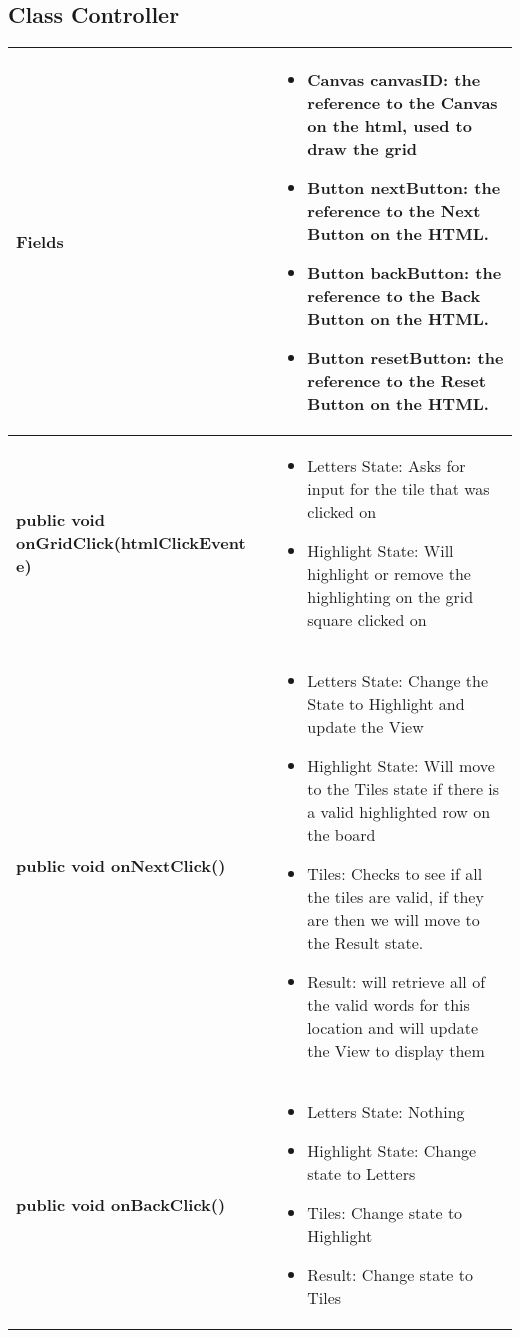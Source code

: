 \documentclass[11pt]{article}
\begin{document}
\subsection{Class Controller }
\begin{longtable}{|p{}|p{}|}
\hline
\textbf{Fields} & 
\begin{itemize}
	\item Canvas canvasID: the reference to the Canvas on the html, used to draw the grid
	\item Button nextButton: the reference to the Next Button on the HTML.
	\item Button backButton: the reference to the Back Button on the HTML.
	\item Button resetButton: the reference to the Reset Button on the HTML.
\end{itemize} \\
%
\hline
\textbf{public void onGridClick(htmlClickEvent e)} & 
\begin{itemize}
	\item Letters State: Asks for input for the tile that was clicked on
	\item Highlight State: Will highlight or remove the highlighting on the grid square clicked on
\end{itemize} \\
%
\hline
\textbf{public void onNextClick()} & 
\begin{itemize}
	\item Letters State: Change the State to Highlight and update the View
	\item Highlight State: Will move to the Tiles state if there is a valid highlighted row on the board
	\item Tiles: Checks to see if all the tiles are valid, if they are then we will move to the Result state.
	\item Result: will retrieve all of the valid words for this location and will update the View to display them
\end{itemize}\\
%
\hline
\textbf{public void onBackClick()} & 
\begin{itemize}
	\item Letters State: Nothing
	\item Highlight State: Change state to Letters
	\item Tiles: Change state to Highlight
	\item Result: Change state to Tiles
\end{itemize} \\

\end{longtable}
\end{document}
